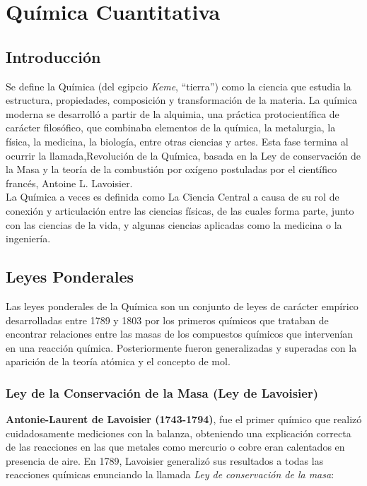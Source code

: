 
\chapter{Química Cuantitativa}

\section{Introducción}
Se define la Química (del egipcio \emph{Keme}, “tierra”) como la ciencia que estudia la estructura, propiedades, composición y transformación de la materia. La química moderna se desarrolló a partir de la alquimia, una práctica protocientífica de carácter filosófico, que combinaba elementos de la química, la metalurgia, la física, la medicina, la biología, entre otras ciencias y artes. Esta fase termina al ocurrir la llamada,Revolución de la Química, basada en la Ley de conservación de la Masa y la teoría de la combustión por oxígeno postuladas por el científico francés, Antoine L. Lavoisier. \\
La Química a veces es definida como La Ciencia Central a causa de su rol de conexión y articulación entre las ciencias físicas, de las cuales forma parte, junto con las ciencias de la vida, y algunas ciencias aplicadas como la medicina o la ingeniería.

\section{Leyes Ponderales}

Las leyes ponderales de la Química son un conjunto de leyes de carácter empírico desarrolladas entre 1789 y 1803 por los primeros químicos que trataban de encontrar relaciones entre las masas de los compuestos químicos que intervenían en una reacción química. Posteriormente fueron generalizadas y superadas con la aparición de la teoría atómica y el concepto de mol.

\subsection{Ley de la Conservación de la Masa (Ley de Lavoisier)}

\textbf{Antonie-Laurent de Lavoisier (1743-1794)}, fue el primer químico que realizó cuidadosamente mediciones con la balanza, obteniendo una explicación correcta de las reacciones en las que metales como mercurio o cobre eran calentados en presencia de aire. En 1789, Lavoisier generalizó sus resultados a todas las reacciones químicas enunciando la llamada \emph{Ley de conservación de la masa}:\\


